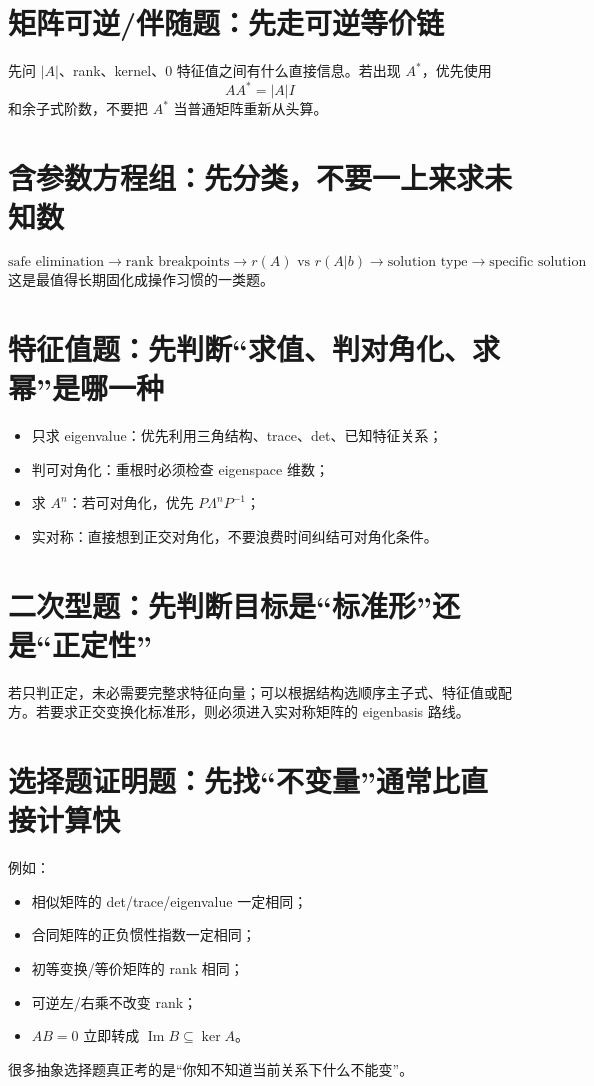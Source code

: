 \documentclass[11pt,a4paper,openany]{ctexbook}
\begin{document}
\section{矩阵可逆/伴随题：先走可逆等价链}
先问 $|A|$、rank、kernel、0 特征值之间有什么直接信息。若出现 $A^*$，优先使用
\[
AA^*=|A|I
\]
和余子式阶数，不要把 $A^*$ 当普通矩阵重新从头算。

\section{含参数方程组：先分类，不要一上来求未知数}
\[
\boxed{\text{safe elimination}\to\text{rank breakpoints}\to r(A)\text{ vs }r(A|b)\to\text{solution type}\to\text{specific solution}}.
\]
这是最值得长期固化成操作习惯的一类题。

\section{特征值题：先判断“求值、判对角化、求幂”是哪一种}
\begin{itemize}
  \item 只求 eigenvalue：优先利用三角结构、trace、det、已知特征关系；
  \item 判可对角化：重根时必须检查 eigenspace 维数；
  \item 求 $A^n$：若可对角化，优先 $P\Lambda^nP^{-1}$；
  \item 实对称：直接想到正交对角化，不要浪费时间纠结可对角化条件。
\end{itemize}

\section{二次型题：先判断目标是“标准形”还是“正定性”}
若只判正定，未必需要完整求特征向量；可以根据结构选顺序主子式、特征值或配方。若要求正交变换化标准形，则必须进入实对称矩阵的 eigenbasis 路线。

\section{选择题证明题：先找“不变量”通常比直接计算快}
例如：
\begin{itemize}
  \item 相似矩阵的 det/trace/eigenvalue 一定相同；
  \item 合同矩阵的正负惯性指数一定相同；
  \item 初等变换/等价矩阵的 rank 相同；
  \item 可逆左/右乘不改变 rank；
  \item $AB=0$ 立即转成 $\operatorname{Im}B\subseteq\ker A$。
\end{itemize}
很多抽象选择题真正考的是“你知不知道当前关系下什么不能变”。
\end{document}
